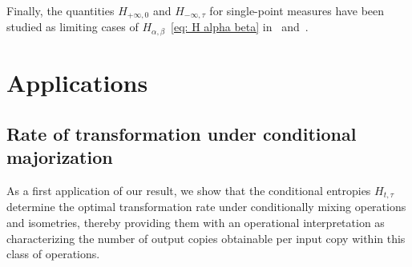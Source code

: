 \documentclass[aps,pra,11pt,onecolumn,nofootinbib,tightenlines]{revtex4-2}
\theoremstyle{definition}
\begin{document}
Finally, the quantities $ H_{+\infty,0}$ and $H_{-\infty,\tau}$ for single-point measures have been studied as limiting cases of
$H_{\alpha,\beta}$~\eqref{eq: H alpha beta} in~\cite{li2025two} and~\cite{rubboli2024quantum}.



 
\section{Applications}
\label{sec: Applications}
\subsection{Rate of transformation under conditional majorization}
As a first application of our result, we show that the conditional entropies $H_{t,\tau}$ determine the optimal transformation rate under conditionally mixing operations and isometries, thereby providing them with an operational interpretation as characterizing the number of output copies obtainable per input copy within this class of operations.
\end{document}
